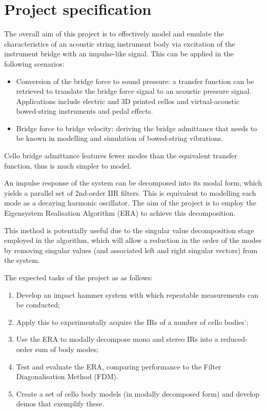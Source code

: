 \section{Project specification}
\label{sec:proj-spec}
The overall aim of this project is to effectively model and emulate the characteristics of an acoustic string instrument body via excitation of the instrument bridge with an impulse-like signal. This can be applied in the following scenarios:

\begin{itemize}
\item Conversion of the bridge force to sound pressure: a transfer function can be retrieved to translate the bridge force signal to an acoustic pressure signal. Applications include electric and 3D printed cellos and virtual-acoustic bowed-string instruments and pedal effects.
\item Bridge force to bridge velocity: deriving the bridge admittance that needs to be known in modelling and simulation of bowed-string vibrations.
\end{itemize}

 Cello bridge admittance features fewer modes than the equivalent transfer function, thus is much simpler to model.

 An impulse response of the system can be decomposed into its modal form, which yields a parallel set of 2nd-order IIR filters. This is equivalent to modelling each mode as a decaying harmonic oscillator. The aim of the project is to employ the Eigensystem Realisation Algorithm (ERA) to achieve this decomposition.

 This method is potentially useful due to the singular value decomposition stage employed in the algorithm, which will allow a reduction in the order of the modes by removing singular values (and associated left and right singular vectors) from the system.

 The expected tasks of the project as as follows:

 \begin{enumerate}
    \item Develop an impact hammer system with which repeatable measurements can be conducted;
    \item Apply this to experimentally acquire the IRs of a number of cello bodies';
    \item Use the ERA to modally decompose mono and stereo IRs into a reduced-order sum of body modes;
    \item Test and evaluate the ERA, comparing performance to the Filter Diagonalisation Method (FDM).
    \item Create a set of cello body models (in modally decomposed form) and develop demos that exemplify these.
 \end{enumerate}

